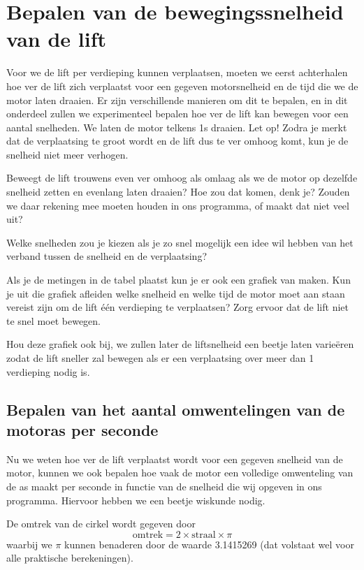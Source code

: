 \documentclass[a4paper, 10pt]{article}
\begin{document}
\section{Bepalen van de bewegingssnelheid van de lift}

Voor we de lift per verdieping kunnen verplaatsen, moeten we eerst achterhalen hoe ver de lift zich verplaatst voor
een gegeven motorsnelheid en de tijd die we de motor laten draaien. Er zijn verschillende manieren om dit te bepalen,
en in dit onderdeel zullen we experimenteel bepalen hoe ver de lift kan bewegen voor een aantal snelheden. We laten
de motor telkens 1s draaien. Let op! Zodra je merkt dat de verplaatsing te groot wordt en de lift dus te ver omhoog
komt, kun je de snelheid niet meer verhogen.

Beweegt de lift trouwens even ver omhoog als omlaag als we de motor op
dezelfde snelheid zetten en evenlang laten draaien? Hoe zou dat komen, denk je? Zouden we daar rekening mee moeten houden
in ons programma, of maakt dat niet veel uit?

Welke snelheden zou je kiezen als je zo snel mogelijk een idee wil hebben van het verband tussen de snelheid
en de verplaatsing?

Als je de metingen in de tabel plaatst kun je er ook een grafiek van maken. Kun je uit die grafiek afleiden welke
snelheid en welke tijd de motor moet aan staan  vereist zijn om de lift \'e\'en verdieping te verplaatsen?
Zorg ervoor dat de lift niet te snel moet bewegen.

Hou deze grafiek ook bij, we zullen later de liftsnelheid een beetje laten varie\"eren zodat de lift sneller zal
bewegen als er een verplaatsing over meer dan 1 verdieping nodig is.

\subsection{Bepalen van het aantal omwentelingen van de motoras per seconde}

Nu we weten hoe ver de lift verplaatst wordt voor een gegeven snelheid van de motor, kunnen we ook bepalen
hoe vaak de motor een volledige omwenteling van de as maakt per seconde in functie van de snelheid die wij
opgeven in ons programma. Hiervoor hebben we een beetje wiskunde nodig.

De omtrek van de cirkel wordt gegeven door
\begin{equation}
\mathrm{omtrek} = 2 \times \mathrm{straal} \times \pi
\end{equation}
waarbij we $\pi$ kunnen benaderen door de waarde 3.1415269 (dat volstaat wel voor alle praktische berekeningen).
\end{document}
